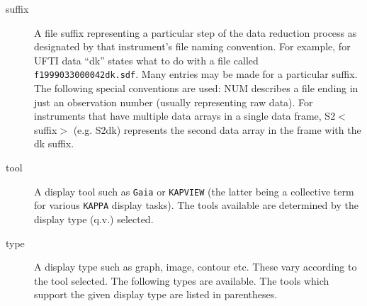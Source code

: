 \documentclass[twoside,11pt]{article}
\renewcommand{\_}{\texttt{\symbol{95}}}
\begin{document}
\begin{description}
\item[suffix] \mbox{}

A file suffix representing a particular step of the data reduction
process as designated by that instrument's file naming convention. For
example, for UFTI data ``dk'' states what to do with a file called
 \texttt{f19990330\_00042\_dk.sdf}. Many entries may be made for a particular
suffix. The following special conventions are used: NUM describes a
file ending in just an observation number (usually representing raw
data). For instruments that have multiple data arrays in a single data
frame, S2$<$suffix$>$ (e.g. S2dk) represents the second data array in the
frame with the \_dk suffix.

\item[tool] \mbox{}

A display tool such as \texttt{Gaia} or \texttt{KAPVIEW} (the latter being a collective
term for various \texttt{KAPPA} display tasks). The tools available are
determined by the display type (q.v.) selected.

\item[type] \mbox{}

A display type such as graph, image, contour etc. These vary according 
to the tool selected.   The following types are available.  The tools
which support the given display type are listed in parentheses.

\end{description}
\end{document}
